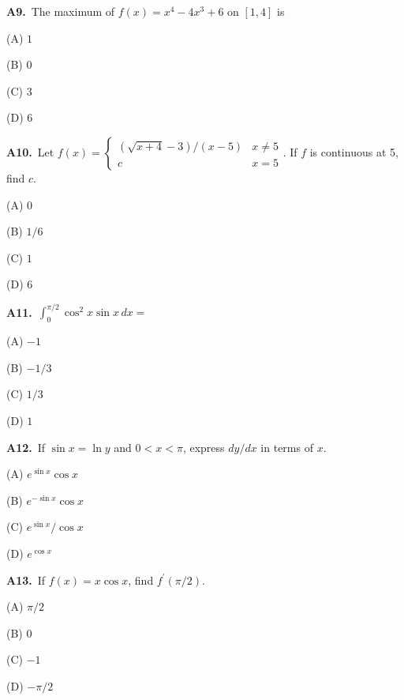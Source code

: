 \documentclass[11pt]{article}
\begin{document}
\bigskip\noindent\textbf{A9.}\ The maximum of $f(x)=x^4-4x^3+6$ on $[1,4]$ is
\begin{list}{}{\setlength{\leftmargin}{3em}\setlength{\labelwidth}{2.5em}\setlength{\itemsep}{0pt}\setlength{\topsep}{2pt}}
\item[(A)] $1$
\item[(B)] $0$
\item[(C)] $3$
\item[(D)] $6$
\end{list}

\bigskip\noindent\textbf{A10.}\ Let $f(x)=\begin{cases}(\sqrt{x+4}-3)/(x-5)&x\ne5\\c&x=5\end{cases}$. If $f$ is continuous at 5, find $c$.
\begin{list}{}{\setlength{\leftmargin}{3em}\setlength{\labelwidth}{2.5em}\setlength{\itemsep}{0pt}\setlength{\topsep}{2pt}}
\item[(A)] $0$
\item[(B)] $1/6$
\item[(C)] $1$
\item[(D)] $6$
\end{list}

\bigskip\noindent\textbf{A11.}\ $\int_0^{\pi/2}\cos^2x\sin x\,dx=$
\begin{list}{}{\setlength{\leftmargin}{3em}\setlength{\labelwidth}{2.5em}\setlength{\itemsep}{0pt}\setlength{\topsep}{2pt}}
\item[(A)] $-1$
\item[(B)] $-1/3$
\item[(C)] $1/3$
\item[(D)] $1$
\end{list}

\bigskip\noindent\textbf{A12.}\ If $\sin x=\ln y$ and $0<x<\pi$, express $dy/dx$ in terms of $x$.
\begin{list}{}{\setlength{\leftmargin}{3em}\setlength{\labelwidth}{2.5em}\setlength{\itemsep}{0pt}\setlength{\topsep}{2pt}}
\item[(A)] $e^{\sin x}\cos x$
\item[(B)] $e^{-\sin x}\cos x$
\item[(C)] $e^{\sin x}/\cos x$
\item[(D)] $e^{\cos x}$
\end{list}

\bigskip\noindent\textbf{A13.}\ If $f(x)=x\cos x$, find $f^{\prime}(\pi/2)$.
\begin{list}{}{\setlength{\leftmargin}{3em}\setlength{\labelwidth}{2.5em}\setlength{\itemsep}{0pt}\setlength{\topsep}{2pt}}
\item[(A)] $\pi/2$
\item[(B)] $0$
\item[(C)] $-1$
\item[(D)] $-\pi/2$
\end{list}
\end{document}
